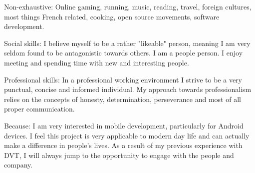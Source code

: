 \spacedhrule{1.6em}{-0.4em}

\inlineheadsection
  {Non-exhaustive:}
  {Online gaming, running, music, reading, travel, foreign cultures, most things French related, cooking, open source movements, software development.}

  
\spacedhrule{1.6em}{-0.4em}  
  

\inlineheadsection
  {Social skills:}
  {I believe myself to be a rather "likeable" person, meaning I am very seldom found to be antagonistic towards others. I am a people person. I enjoy meeting and spending time with new and interesting people.}
  
\inlineheadsection
  {Professional skills:}
  {In a professional working environment I strive to be a very punctual, concise and informed individual. My approach towards professionalism relies on the concepts of honesty, determination, perseverance and most of all proper communication.}
  
\spacedhrule{1.6em}{-0.4em}  
  

\inlineheadsection
  {Because:}
  {I am very interested in mobile development, particularly for Android devices. I feel this project is very applicable to modern day life and can actually make a difference in people's lives. As a result of my previous experience with DVT, I will always jump to the opportunity to engage with the people and company.}